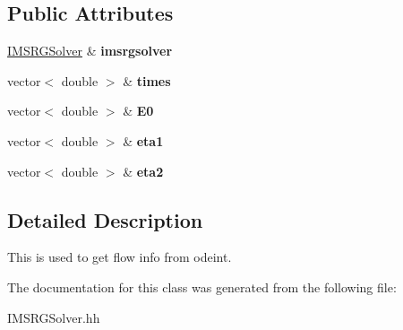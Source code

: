 \subsection*{Public Attributes}
\begin{DoxyCompactItemize}
\item 
\mbox{\label{classIMSRGSolver_1_1ODE__Monitor_a2f886596ad59d99979612a6975d81068}} 
\hyperlink{classIMSRGSolver}{I\+M\+S\+R\+G\+Solver} \& {\bfseries imsrgsolver}
\item 
\mbox{\label{classIMSRGSolver_1_1ODE__Monitor_a5530af556b23dcdc41530ff17deb8eaa}} 
vector$<$ double $>$ \& {\bfseries times}
\item 
\mbox{\label{classIMSRGSolver_1_1ODE__Monitor_a22926dafa1516d78db094f1fb1d538bc}} 
vector$<$ double $>$ \& {\bfseries E0}
\item 
\mbox{\label{classIMSRGSolver_1_1ODE__Monitor_a5c51b7b27350fdbe70bb2d9f7fbc15fa}} 
vector$<$ double $>$ \& {\bfseries eta1}
\item 
\mbox{\label{classIMSRGSolver_1_1ODE__Monitor_ad3f632913a67694d3cbc3e32642aeb73}} 
vector$<$ double $>$ \& {\bfseries eta2}
\end{DoxyCompactItemize}


\subsection{Detailed Description}
This is used to get flow info from odeint. 

The documentation for this class was generated from the following file\+:\begin{DoxyCompactItemize}
\item 
I\+M\+S\+R\+G\+Solver.\+hh\end{DoxyCompactItemize}
